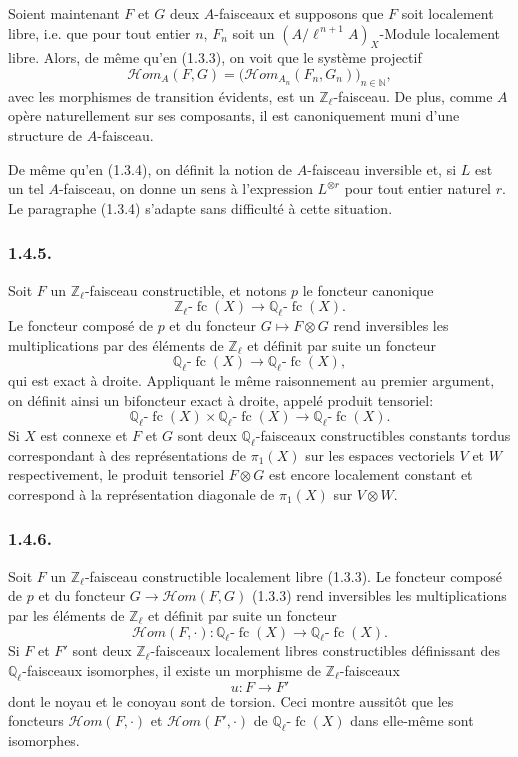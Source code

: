 \documentclass[11pt]{article}
\providecommand{\cHom}{\mathcal{H}om}
\providecommand{\fc}{\operatorname{fc}}
\begin{document}
Soient maintenant \(F\) et \(G\) deux \(A\)-faisceaux et supposons que \(F\) soit localement libre, i.e. que pour tout entier \(n\), \(F_n\) soit un \((A/\ell^{\,n+1}A)_X\)-Module localement libre. Alors, de même qu'en (1.3.3), on
voit que le système projectif
\[
\cHom_A(F,G)=\bigl(\cHom_{A_n}(F_n,G_n)\bigr)_{n\in\mathbb N},
\]
avec les morphismes de transition évidents, est un \(\mathbb Z_\ell\)-faisceau. De plus, comme \(A\) opère naturellement sur ses composants, il est canoniquement muni d'une structure de \(A\)-faisceau.

De même qu'en (1.3.4), on définit la notion de \(A\)-faisceau inversible et, si \(L\) est un tel \(A\)-faisceau, on donne un sens à l'expression \(L^{\otimes r}\) pour tout entier naturel \(r\). Le paragraphe (1.3.4) s'adapte sans difficulté à cette situation.

\subsubsection*{1.4.5.}
Soit \(F\) un \(\mathbb Z_\ell\)-faisceau constructible, et notons \(p\) le foncteur canonique
\[
\mathbb Z_\ell\text{-}\fc(X)\longrightarrow \mathbb Q_\ell\text{-}\fc(X).
\]
Le foncteur composé de \(p\) et du foncteur \(G\mapsto F\otimes G\) rend inversibles les multiplications par des éléments de \(\mathbb Z_\ell\) et définit par suite un foncteur
\[
\mathbb Q_\ell\text{-}\fc(X)\longrightarrow \mathbb Q_\ell\text{-}\fc(X),
\]
qui est exact à droite. Appliquant le même raisonnement au premier argument, on définit ainsi un bifoncteur exact à droite, appelé produit tensoriel:
\[
\mathbb Q_\ell\text{-}\fc(X)\times \mathbb Q_\ell\text{-}\fc(X)
\longrightarrow \mathbb Q_\ell\text{-}\fc(X).
\]
Si \(X\) est connexe et \(F\) et \(G\) sont deux \(\mathbb Q_\ell\)-faisceaux constructibles constants tordus correspondant à des représentations de \(\pi_1(X)\) sur les espaces vectoriels \(V\) et \(W\) respectivement, le produit tensoriel \(F\otimes G\) est encore localement constant et correspond à la représentation diagonale de \(\pi_1(X)\) sur \(V\otimes W\).

\subsubsection*{1.4.6.}
Soit \(F\) un \(\mathbb Z_\ell\)-faisceau constructible localement libre (1.3.3). Le foncteur composé de \(p\) et du foncteur \(G\longrightarrow\cHom(F,G)\) (1.3.3) rend inversibles les multiplications par les éléments de \(\mathbb Z_\ell\) et définit par suite un foncteur
\[
\cHom(F,\cdot):\mathbb Q_\ell\text{-}\fc(X)\longrightarrow \mathbb Q_\ell\text{-}\fc(X).
\]
Si \(F\) et \(F'\) sont deux \(\mathbb Z_\ell\)-faisceaux localement libres constructibles définissant des \(\mathbb Q_\ell\)-faisceaux isomorphes, il existe un morphisme de \(\mathbb Z_\ell\)-faisceaux
\[
u:F\longrightarrow F'
\]
dont le noyau et le conoyau sont de torsion. Ceci montre aussitôt que les foncteurs \(\cHom(F,\cdot)\) et \(\cHom(F',\cdot)\) de \(\mathbb Q_\ell\text{-}\fc(X)\) dans elle-même sont isomorphes.
\end{document}
